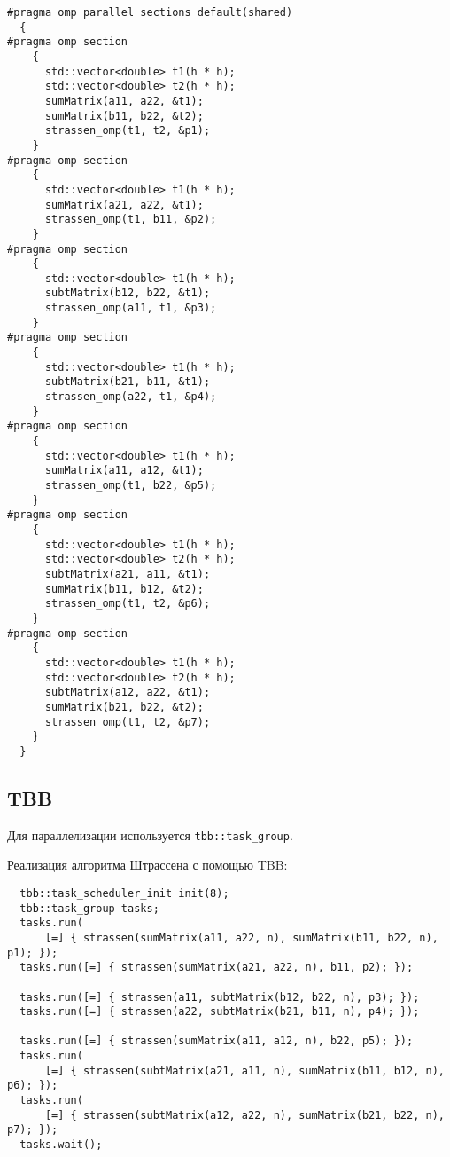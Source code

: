\documentclass{article}
\begin{document}
\vspace{10pt}
\begin{lstlisting}
#pragma omp parallel sections default(shared)
  {
#pragma omp section
    {
      std::vector<double> t1(h * h);
      std::vector<double> t2(h * h);
      sumMatrix(a11, a22, &t1);
      sumMatrix(b11, b22, &t2);
      strassen_omp(t1, t2, &p1);
    }
#pragma omp section
    {
      std::vector<double> t1(h * h);
      sumMatrix(a21, a22, &t1);
      strassen_omp(t1, b11, &p2);
    }
#pragma omp section
    {
      std::vector<double> t1(h * h);
      subtMatrix(b12, b22, &t1);
      strassen_omp(a11, t1, &p3);
    }
#pragma omp section
    {
      std::vector<double> t1(h * h);
      subtMatrix(b21, b11, &t1);
      strassen_omp(a22, t1, &p4);
    }
#pragma omp section
    {
      std::vector<double> t1(h * h);
      sumMatrix(a11, a12, &t1);
      strassen_omp(t1, b22, &p5);
    }
#pragma omp section
    {
      std::vector<double> t1(h * h);
      std::vector<double> t2(h * h);
      subtMatrix(a21, a11, &t1);
      sumMatrix(b11, b12, &t2);
      strassen_omp(t1, t2, &p6);
    }
#pragma omp section
    {
      std::vector<double> t1(h * h);
      std::vector<double> t2(h * h);
      subtMatrix(a12, a22, &t1);
      sumMatrix(b21, b22, &t2);
      strassen_omp(t1, t2, &p7);
    }
  }
\end{lstlisting}
\vspace{-25pt}

\subsection{TBB}
Для параллелизации используется \verb|tbb::task_group|.

\par Реализация алгоритма Штрассена с помощью TBB:

\vspace{10pt}
\begin{lstlisting}
  tbb::task_scheduler_init init(8);
  tbb::task_group tasks;
  tasks.run(
      [=] { strassen(sumMatrix(a11, a22, n), sumMatrix(b11, b22, n), p1); });
  tasks.run([=] { strassen(sumMatrix(a21, a22, n), b11, p2); });

  tasks.run([=] { strassen(a11, subtMatrix(b12, b22, n), p3); });
  tasks.run([=] { strassen(a22, subtMatrix(b21, b11, n), p4); });

  tasks.run([=] { strassen(sumMatrix(a11, a12, n), b22, p5); });
  tasks.run(
      [=] { strassen(subtMatrix(a21, a11, n), sumMatrix(b11, b12, n), p6); });
  tasks.run(
      [=] { strassen(subtMatrix(a12, a22, n), sumMatrix(b21, b22, n), p7); });
  tasks.wait();
\end{lstlisting}
\vspace{-25pt}
\end{document}
